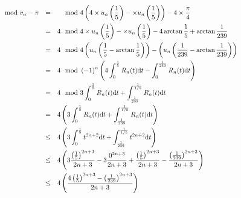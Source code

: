 \documentclass[a4paper,french,bookmarks]{article}
\begin{document}

\begin{align*}
    \qquad \mod{v_n - \pi} &&=&& &\mod{4\left(4\times u_n\left(\dfrac{1}{5}\right)-\times u_n\left(\dfrac{1}{5}\right)\right) - 4\times\dfrac{\pi}{4}}\\
    &&=&& 4&\mod{4\times u_n\left(\dfrac{1}{5}\right)-\times u_n\left(\dfrac{1}{5}\right) - 4\arctan{\dfrac{1}{5}}+\arctan{\dfrac{1}{239}}}\\
    &&=&& 4&\mod{4\left(u_n\left(\dfrac{1}{5}-\arctan{\dfrac{1}{5}}\right)\right)-\left(u_n\left(\dfrac{1}{239}-\arctan{\dfrac{1}{239}}\right)\right)} &&\qquad\qquad\qquad \\
    &&=&& 4&\mod{\left(-1\right)^n\left(4\int_0^{\frac{1}{5}}R_n(t)\text dt-\int_0^{\frac{1}{239}}R_n(t)\text dt\right)}\\
    &&=&& 4&\mod{3\int_0^{\frac{1}{5}}R_n(t)\text dt+\int_{\frac{1}{239}}^{\frac{1}{1/5}}R_n(t)\text dt}\\
    &&=&& 4&\left(3\int_0^{\frac{1}{5}}R_n(t)\text dt+\int_{\frac{1}{239}}^{\frac{1}{1/5}}R_n(t)\text dt\right)\\
    &&\leq&&4&\left(3\int_0^{\frac{1}{5}}t^{2n+2}\text dt+\int_{\frac{1}{239}}^{\frac{1}{1/5}}t^{2n+2}\text dt\right)\\
    &&\leq&&4&\left(3\dfrac{\left(\frac{1}{5}\right)^{2n+3}}{2n+3}-3\dfrac{0^{2n+3}}{2n+3}+\dfrac{\left(\frac{1}{5}\right)^{2n+3}}{2n+3}-\dfrac{\left(\frac{1}{239}\right)^{2n+3}}{2n+3}\right)\\
    &&\leq&&4&\left(\dfrac{4\left(\frac{1}{5}\right)^{2n+3}-\left(\frac{1}{239}\right)^{2n+3}}{2n+3}\right)
\end{align*}
\end{document}
